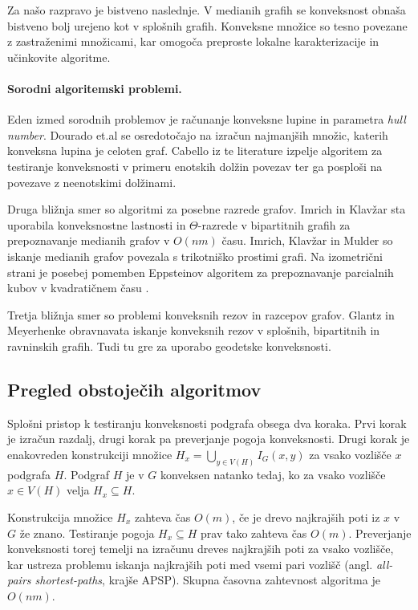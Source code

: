 \documentclass[sigconf
]{acmart}
\theoremstyle{definition}
\begin{document}
Za našo razpravo je bistveno naslednje.
V medianih grafih se konveksnost obnaša bistveno bolj urejeno kot v splošnih grafih.
Konveksne množice so tesno povezane z zastraženimi množicami, kar omogoča preproste lokalne karakterizacije in učinkovite algoritme.

\paragraph{Sorodni algoritemski problemi.}
Eden izmed sorodnih problemov je računanje konveksne lupine in parametra \emph{hull number}.
Dourado et.al \cite{dourado2009computation} se osredotočajo na izračun najmanjših množic, katerih konveksna lupina je celoten graf.
Cabello iz te literature izpelje algoritem za testiranje konveksnosti v primeru enotskih dolžin povezav ter ga posploši na povezave z neenotskimi dolžinami.

Druga bližnja smer so algoritmi za posebne razrede grafov.
Imrich in Klavžar \cite{imrich1998convexity} sta uporabila konveksnostne lastnosti in \(\Theta\)-razrede v bipartitnih grafih za
prepoznavanje medianih grafov v $O(nm)$ času.
Imrich, Klavžar in Mulder \cite{imrichWilfriedKlavzar1999} so iskanje medianih grafov povezala s trikotniško prostimi grafi.
Na izometrični strani je posebej pomemben Eppsteinov algoritem za prepoznavanje parcialnih kubov v kvadratičnem času \cite{eppstein2007recognizing}.

Tretja bližnja smer so problemi konveksnih rezov in razcepov grafov.
Glantz in Meyerhenke \cite{glantz2017finding} obravnavata iskanje konveksnih rezov v splošnih, bipartitnih in ravninskih grafih.
Tudi tu gre za uporabo geodetske konveksnosti.

\subsection{Pregled obstoječih algoritmov}

Splošni pristop k testiranju konveksnosti podgrafa obsega dva koraka.
Prvi korak je izračun razdalj, drugi korak pa preverjanje pogoja konveksnosti.
Drugi korak je enakovreden konstrukciji množice \(H_x = \bigcup_{y \in V(H)} I_G(x,y)\) za vsako vozlišče \(x\) podgrafa \(H\).
Podgraf \(H\) je v \(G\) konveksen natanko tedaj, ko za vsako vozlišče \(x \in V(H)\) velja \(H_x \subseteq H\).

Konstrukcija množice \(H_x\) zahteva čas \(O(m)\), če je drevo najkrajših poti iz \(x\) v \(G\) že znano.
Testiranje pogoja \(H_x \subseteq H\) prav tako zahteva čas \(O(m)\).
Preverjanje konveksnosti torej temelji na izračunu dreves najkrajših poti za vsako vozlišče, kar ustreza problemu iskanja najkrajših poti med vsemi pari vozlišč (angl. \emph{all-pairs shortest-paths}, krajše APSP). Skupna časovna zahtevnost algoritma je \(O(nm)\).
\end{document}
